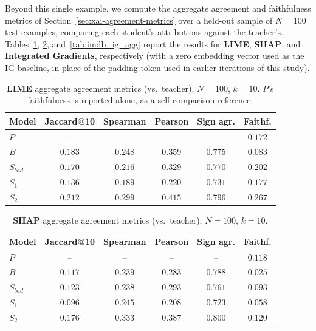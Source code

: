 \documentclass[conference]{IEEEtran}
\begin{document}
Beyond this single example, we compute the aggregate agreement and faithfulness metrics of Section~\ref{sec:xai-agreement-metrics} over a held-out sample of $N=100$ test examples, comparing each student's attributions against the teacher's. Tables~\ref{tab:imdb_lime_agg}, \ref{tab:imdb_shap_agg}, and~\ref{tab:imdb_ig_agg} report the results for \textbf{LIME}, \textbf{SHAP}, and \textbf{Integrated Gradients}, respectively (with a zero embedding vector used as the IG baseline, in place of the padding token used in earlier iterations of this study).

\begin{table}[h!]
\centering
\caption{\textbf{LIME} aggregate agreement metrics (vs.\ teacher), $N=100$, $k=10$. $P$'s faithfulness is reported alone, as a self-comparison reference.}
\footnotesize
\begin{tabular}{|l|c|c|c|c|c|}
\hline
Model & Jaccard@10 & Spearman & Pearson & Sign agr. & Faithf. \\ \hline
$P$ & -- & -- & -- & -- & $0.172$ \\
$B$ & $0.183$ & $0.248$ & $0.359$ & $0.775$ & $0.083$ \\
$S_{bad}$ & $0.170$ & $0.216$ & $0.329$ & $0.770$ & $0.202$ \\
$S_1$ & $0.136$ & $0.189$ & $0.220$ & $0.731$ & $0.177$ \\
$S_2$ & $0.212$ & $0.299$ & $0.415$ & $0.796$ & $0.267$ \\ \hline
\end{tabular}
\label{tab:imdb_lime_agg}
\end{table}

\begin{table}[h!]
\centering
\caption{\textbf{SHAP} aggregate agreement metrics (vs.\ teacher), $N=100$, $k=10$.}
\footnotesize
\begin{tabular}{|l|c|c|c|c|c|}
\hline
Model & Jaccard@10 & Spearman & Pearson & Sign agr. & Faithf. \\ \hline
$P$ & -- & -- & -- & -- & $0.118$ \\
$B$ & $0.117$ & $0.239$ & $0.283$ & $0.788$ & $0.025$ \\
$S_{bad}$ & $0.123$ & $0.238$ & $0.293$ & $0.761$ & $0.093$ \\
$S_1$ & $0.096$ & $0.245$ & $0.208$ & $0.723$ & $0.058$ \\
$S_2$ & $0.176$ & $0.333$ & $0.387$ & $0.800$ & $0.120$ \\ \hline
\end{tabular}
\label{tab:imdb_shap_agg}
\end{table}
\end{document}
